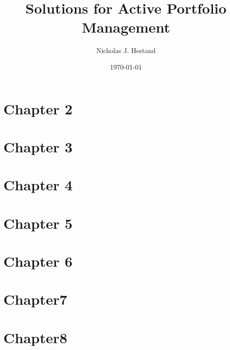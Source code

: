 \documentclass[10pt]{article}
\begin{document}
  \title{Solutions for Active Portfolio Management}
  \author{Nicholas J. Hestand}
  \date{\today}
  
  \maketitle
  
  \section*{Chapter 2}
  
  
  \newpage
  \section*{Chapter 3}
  
  
  \newpage
  \section*{Chapter 4}
  
  
  \newpage
  \section*{Chapter 5}
  
  
  \newpage
  \section*{Chapter 6}
  
  
  \newpage
  \section*{Chapter7}
  
  
  \newpage
  \section*{Chapter8}
  
  
\end{document}

